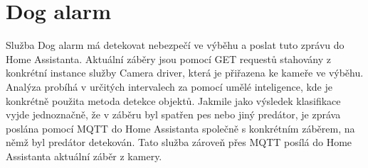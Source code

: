 \section{Dog alarm}\label{sec:dog-alarm}
Služba Dog alarm má detekovat nebezpečí ve výběhu a poslat tuto zprávu do Home Assistanta.\newline
Aktuální záběry jsou pomocí GET requestů stahovány z konkrétní instance služby Camera driver, která je přiřazena ke kameře ve výběhu.
Analýza probíhá v určitých intervalech za pomocí umělé inteligence, kde je konkrétně použita metoda detekce objektů.
Jakmile jako výsledek klasifikace vyjde jednoznačně, že v záběru byl spatřen pes nebo jiný predátor, je zpráva poslána pomocí MQTT do Home Assistanta společně s konkrétním záběrem, na němž byl predátor detekován.
Tato služba zároveň přes MQTT posílá do Home Assistanta aktuální záběr z kamery.